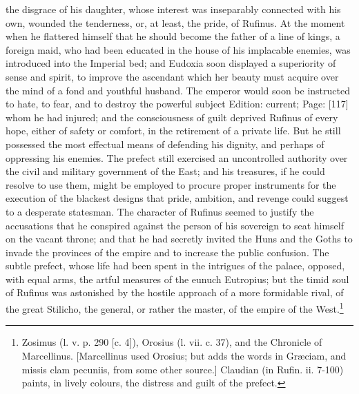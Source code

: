 the disgrace of his daughter, whose interest was inseparably connected with his own, wounded the tenderness, or, at least, the pride, of Rufinus. At the moment when he flattered himself that he should become the father of a line of kings, a foreign maid, who had been educated in the house of his implacable enemies, was introduced into the Imperial bed; and Eudoxia soon displayed a superiority of sense and spirit, to improve the ascendant which her beauty must acquire over the mind of a fond and youthful husband. The emperor would soon be instructed to hate, to fear, and to destroy the powerful subject Edition: current; Page: [117] whom he had injured; and the consciousness of guilt deprived Rufinus of every hope, either of safety or comfort, in the retirement of a private life. But he still possessed the most effectual means of defending his dignity, and perhaps of oppressing his enemies. The prefect still exercised an uncontrolled authority over the civil and military government of the East; and his treasures, if he could resolve to use them, might be employed to procure proper instruments for the execution of the blackest designs that pride, ambition, and revenge could suggest to a desperate statesman. The character of Rufinus seemed to justify the accusations that he conspired against the person of his sovereign to seat himself on the vacant throne; and that he had secretly invited the Huns and the Goths to invade the provinces of the empire and to increase the public confusion. The subtle prefect, whose life had been spent in the intrigues of the palace, opposed, with equal arms, the artful measures of the eunuch Eutropius; but the timid soul of Rufinus was astonished by the hostile approach of a more formidable rival, of the great Stilicho, the general, or rather the master, of the empire of the West.\footnote{Zosimus (l. v. p. 290 [c. 4]), Orosius (l. vii. c. 37), and the Chronicle of Marcellinus. [Marcellinus used Orosius; but adds the words in Græciam, and missis clam pecuniis, from some other source.] Claudian (in Rufin. ii. 7-100) paints, in lively colours, the distress and guilt of the prefect.}

